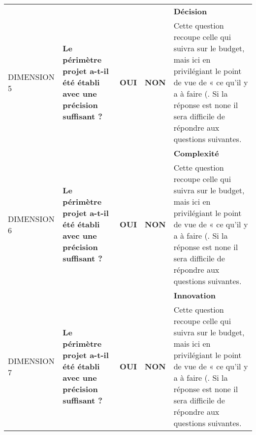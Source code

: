 \documentclass[12pt]{article}
\begin{document}
\begin{landscape}
\begin{table}[H]
\begin{tabular}{p{2.25cm}p{}p{1cm}p{1cm}p{12.25cm}}
\hline \cellcolor{green!75}& \cellcolor{green!75}& \cellcolor{green!75}& \cellcolor{green!75}&\bf Décision \cellcolor{green!75}\\
DIMENSION 5\cellcolor{green!75} & \bf Le périmètre projet a-t-il été établi avec une précision suffisant ? & \bf OUI \cellcolor{green!50}& \bf NON\cellcolor{red!50} & Cette question recoupe celle qui suivra sur le budget, mais ici en privilégiant le point de vue de « ce qu’il y a à faire (. Si la réponse est none il sera difficile de répondre aux questions suivantes. \\
\hline \cellcolor{blue!50}& \cellcolor{blue!50}& \cellcolor{blue!50}& \cellcolor{blue!50}&\bf Complexité \cellcolor{blue!50}\\
DIMENSION 6\cellcolor{blue!50} & \bf Le périmètre projet a-t-il été établi avec une précision suffisant ? & \bf OUI \cellcolor{green!50}& \bf NON\cellcolor{red!50} & Cette question recoupe celle qui suivra sur le budget, mais ici en privilégiant le point de vue de « ce qu’il y a à faire (. Si la réponse est none il sera difficile de répondre aux questions suivantes. \\
\hline \cellcolor{blue!70}& \cellcolor{blue!70}& \cellcolor{blue!70}& \cellcolor{blue!70}&\bf Innovation \cellcolor{blue!70}\\
DIMENSION 7\cellcolor{blue!70} & \bf Le périmètre projet a-t-il été établi avec une précision suffisant ? & \bf OUI \cellcolor{green!50}& \bf NON\cellcolor{red!50} & Cette question recoupe celle qui suivra sur le budget, mais ici en privilégiant le point de vue de « ce qu’il y a à faire (. Si la réponse est none il sera difficile de répondre aux questions suivantes. \\



\hline
\end{tabular}
\end{table}
\end{landscape}
\end{document}
